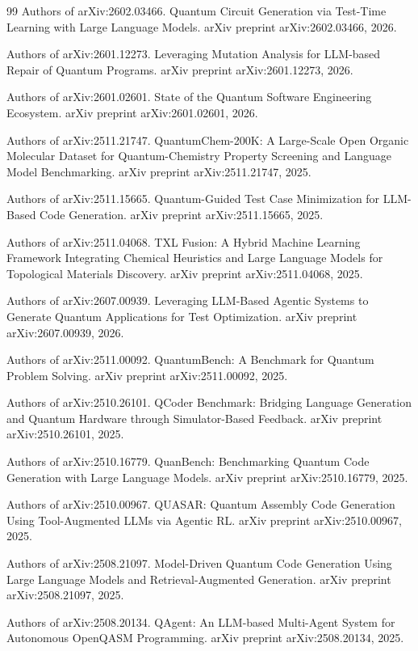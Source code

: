 \documentclass[11pt,a4paper]{article}
\begin{document}
\begin{thebibliography}{99}
 Authors of arXiv:2602.03466. Quantum Circuit Generation via Test-Time Learning with Large Language Models. arXiv preprint arXiv:2602.03466, 2026.

 Authors of arXiv:2601.12273. Leveraging Mutation Analysis for LLM-based Repair of Quantum Programs. arXiv preprint arXiv:2601.12273, 2026.

 Authors of arXiv:2601.02601. State of the Quantum Software Engineering Ecosystem. arXiv preprint arXiv:2601.02601, 2026.

 Authors of arXiv:2511.21747. QuantumChem-200K: A Large-Scale Open Organic Molecular Dataset for Quantum-Chemistry Property Screening and Language Model Benchmarking. arXiv preprint arXiv:2511.21747, 2025.

 Authors of arXiv:2511.15665. Quantum-Guided Test Case Minimization for LLM-Based Code Generation. arXiv preprint arXiv:2511.15665, 2025.

 Authors of arXiv:2511.04068. TXL Fusion: A Hybrid Machine Learning Framework Integrating Chemical Heuristics and Large Language Models for Topological Materials Discovery. arXiv preprint arXiv:2511.04068, 2025.

 Authors of arXiv:2607.00939. Leveraging LLM-Based Agentic Systems to Generate Quantum Applications for Test Optimization. arXiv preprint arXiv:2607.00939, 2026.

 Authors of arXiv:2511.00092. QuantumBench: A Benchmark for Quantum Problem Solving. arXiv preprint arXiv:2511.00092, 2025.

 Authors of arXiv:2510.26101. QCoder Benchmark: Bridging Language Generation and Quantum Hardware through Simulator-Based Feedback. arXiv preprint arXiv:2510.26101, 2025.

 Authors of arXiv:2510.16779. QuanBench: Benchmarking Quantum Code Generation with Large Language Models. arXiv preprint arXiv:2510.16779, 2025.

 Authors of arXiv:2510.00967. QUASAR: Quantum Assembly Code Generation Using Tool-Augmented LLMs via Agentic RL. arXiv preprint arXiv:2510.00967, 2025.

 Authors of arXiv:2508.21097. Model-Driven Quantum Code Generation Using Large Language Models and Retrieval-Augmented Generation. arXiv preprint arXiv:2508.21097, 2025.

 Authors of arXiv:2508.20134. QAgent: An LLM-based Multi-Agent System for Autonomous OpenQASM Programming. arXiv preprint arXiv:2508.20134, 2025.


\end{thebibliography}
\end{document}
